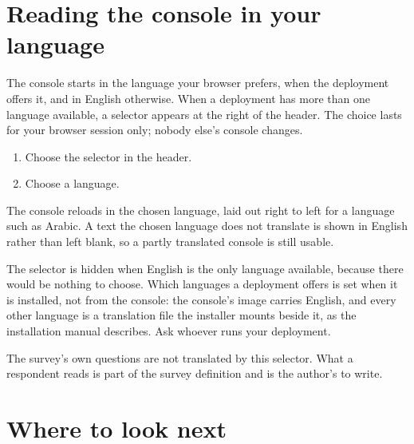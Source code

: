 \documentclass[11pt, a4paper]{article}
\begin{document}
\section{Reading the console in your language}
\label{sec:language}

The console starts in the language your browser prefers, when the deployment offers it, and
in English otherwise. When a deployment has more than one language available, a selector
appears at the right of the header. The choice lasts for your browser session only; nobody
else's console changes.

\begin{enumerate}
  \item Choose the selector in the header.
  \item Choose a language.
\end{enumerate}


The console reloads in the chosen language, laid out right to left for a language such as
Arabic. A text the chosen language does not translate is shown in English rather than left
blank, so a partly translated console is still usable.

\begin{elicitnote}
The selector is hidden when English is the only language available, because there would be
nothing to choose. Which languages a deployment offers is set when it is installed, not from the
console: the console's image carries English, and every other language is a translation file the
installer mounts beside it, as the installation manual describes. Ask whoever runs your
deployment.
\end{elicitnote}

The survey's own questions are not translated by this selector. What a respondent reads is part
of the survey definition and is the author's to write.

\section{Where to look next}
\label{sec:next}
\end{document}
